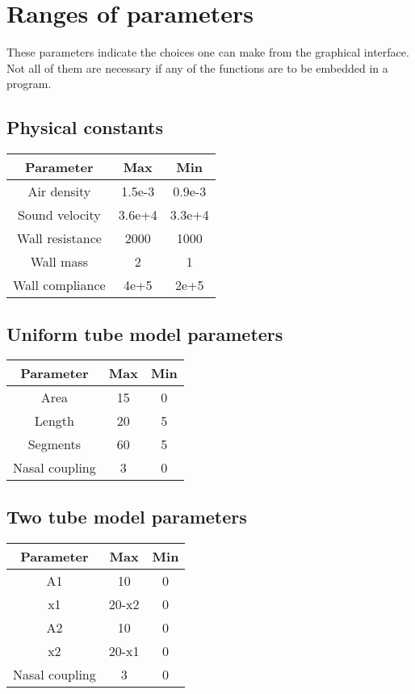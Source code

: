 \appendix
\chapter{Ranges of parameters}
These parameters indicate the choices one can make from the
graphical interface. Not all of them are necessary if any of the
functions are to be embedded in a program.

\section{Physical constants}
\begin{center}
\begin{tabular}{|c|c|c|}
\hline Parameter  & Max & Min  \\ \hline Air density  & 1.5e-3 &
0.9e-3
\\ \hline
Sound velocity  & 3.6e+4  & 3.3e+4 \\ \hline Wall resistance  &
2000 & 1000
\\ \hline
Wall mass  & 2 & 1 \\ \hline Wall compliance  & 4e+5 & 2e+5 \\
\hline
\end{tabular}
\end{center}

\section{Uniform tube model parameters}
\begin{center}
\begin{tabular}{|c|c|c|}
\hline Parameter  & Max & Min  \\ \hline Area  & 15 & 0 \\ \hline
Length  & 20 & 5 \\ \hline Segments & 60 & 5
\\ \hline
Nasal coupling  & 3 & 0 \\ \hline
\end{tabular}
\end{center}

\section{Two tube model parameters}
\begin{center}
\begin{tabular}{|c|c|c|}
\hline Parameter  & Max & Min  \\ \hline A1 & 10 & 0 \\ \hline x1
& 20-x2 & 0 \\ \hline A2 & 10 & 0 \\ \hline x2  & 20-x1 & 0 \\
\hline Nasal coupling & 3 & 0 \\ \hline
\end{tabular}
\end{center}

